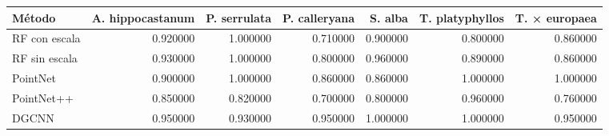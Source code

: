 \begin{tabular}{lrrrrrr}
\toprule
Método & A. hippocastanum & P. serrulata & P. calleryana & S. alba & T. platyphyllos & T. × europaea \\
\midrule
RF con escala & 0.920000 & 1.000000 & 0.710000 & 0.900000 & 0.800000 & 0.860000 \\
RF sin escala & 0.930000 & 1.000000 & 0.800000 & 0.960000 & 0.890000 & 0.860000 \\
PointNet & 0.900000 & 1.000000 & 0.860000 & 0.860000 & 1.000000 & 1.000000 \\
PointNet++ & 0.850000 & 0.820000 & 0.700000 & 0.800000 & 0.960000 & 0.760000 \\
DGCNN & 0.950000 & 0.930000 & 0.950000 & 1.000000 & 1.000000 & 0.950000 \\
\bottomrule
\end{tabular}
